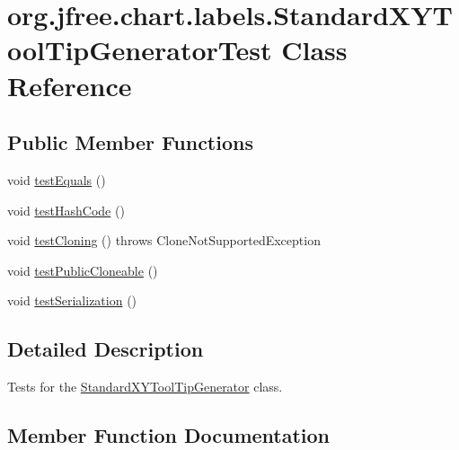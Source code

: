 \hypertarget{classorg_1_1jfree_1_1chart_1_1labels_1_1_standard_x_y_tool_tip_generator_test}{}\section{org.\+jfree.\+chart.\+labels.\+Standard\+X\+Y\+Tool\+Tip\+Generator\+Test Class Reference}
\label{classorg_1_1jfree_1_1chart_1_1labels_1_1_standard_x_y_tool_tip_generator_test}
\subsection*{Public Member Functions}
\begin{DoxyCompactItemize}
\item 
void \mbox{\hyperlink{classorg_1_1jfree_1_1chart_1_1labels_1_1_standard_x_y_tool_tip_generator_test_a4fffb7427bbdfcbbdf4d3c77f70ef3c2}{test\+Equals}} ()
\item 
void \mbox{\hyperlink{classorg_1_1jfree_1_1chart_1_1labels_1_1_standard_x_y_tool_tip_generator_test_a7324a3de74556c6da0b19b6166f48c94}{test\+Hash\+Code}} ()
\item 
void \mbox{\hyperlink{classorg_1_1jfree_1_1chart_1_1labels_1_1_standard_x_y_tool_tip_generator_test_a6c02b8a9f45d69cc71af48865e14243f}{test\+Cloning}} ()  throws Clone\+Not\+Supported\+Exception 
\item 
void \mbox{\hyperlink{classorg_1_1jfree_1_1chart_1_1labels_1_1_standard_x_y_tool_tip_generator_test_ae4abc726f1580371462b8aba4f101cbb}{test\+Public\+Cloneable}} ()
\item 
void \mbox{\hyperlink{classorg_1_1jfree_1_1chart_1_1labels_1_1_standard_x_y_tool_tip_generator_test_ab783e169f905c8fa6c25f56ceec4057e}{test\+Serialization}} ()
\end{DoxyCompactItemize}


\subsection{Detailed Description}
Tests for the \mbox{\hyperlink{classorg_1_1jfree_1_1chart_1_1labels_1_1_standard_x_y_tool_tip_generator}{Standard\+X\+Y\+Tool\+Tip\+Generator}} class. 

\subsection{Member Function Documentation}
\mbox{\label{classorg_1_1jfree_1_1chart_1_1labels_1_1_standard_x_y_tool_tip_generator_test_a6c02b8a9f45d69cc71af48865e14243f}} 
